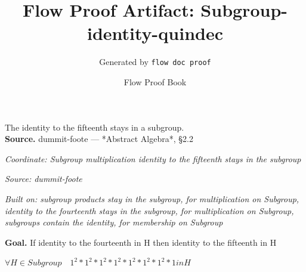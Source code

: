 \documentclass[11pt]{article}
\title{Flow Proof Artifact: Subgroup-identity-quindec}
\author{Generated by \texttt{flow doc proof}}
\date{Flow Proof Book}
\theoremstyle{definition}
\begin{document}
\maketitle
The identity to the fifteenth stays in a subgroup.\\[0.5em]
\textbf{Source.} dummit-foote — *Abstract Algebra*, §2.2\\[0.5em]
\bigskip
{}\par
\smallskip\noindent\textit{Coordinate: Subgroup \cdot multiplication \cdot identity to the fifteenth stays in the subgroup}\par
\smallskip\noindent\textit{Source: dummit-foote}\par
\smallskip\noindent\textit{Built on: subgroup products stay in the subgroup, for multiplication on Subgroup, identity to the fourteenth stays in the subgroup, for multiplication on Subgroup, subgroups contain the identity, for membership on Subgroup}\par
\medskip
\noindent\textbf{Goal.} If identity to the fourteenth in H then identity to the fifteenth in H\par
\noindent$\displaystyle \forall H \in Subgroup\quad 1^{2} * 1^{2} * 1^{2} * 1^{2} * 1^{2} * 1^{2} * 1^{2} * 1 in H$\par
\medskip
\noindent
\end{document}
